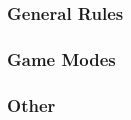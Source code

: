 
\subsubsection{General Rules}

\subsubsection{\label{game_modes}Game Modes}

\subsubsection{Other}


